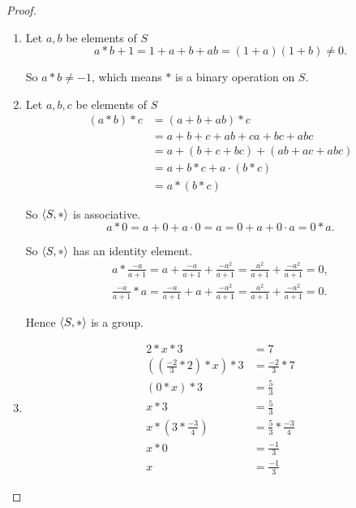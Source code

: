 \begin{proof}
    \begin{enumerate}[label={\textbf{\alph*.}}]
        \item Let $a, b$ be elements of $S$
              \[
                  a * b + 1 = 1 + a + b + ab = (1 + a)(1 + b)\ne 0.
              \]

              So $a * b\ne -1$, which means $*$ is a binary operation on $S$.
        \item Let $a, b, c$ be elements of $S$
              \begin{align*}
                  (a * b) * c & = (a + b + ab) * c                   \\
                              & = a + b + c + ab + ca + bc + abc     \\
                              & = a + (b + c + bc) + (ab + ac + abc) \\
                              & = a + b * c + a\cdot (b * c)         \\
                              & = a * (b * c)
              \end{align*}

              So $\left\langle{S, *}\right\rangle$ is associative.
              \[
                  a * 0 = a + 0 + a\cdot 0 = a = 0 + a + 0\cdot a = 0 * a.
              \]

              So $\left\langle{S, *}\right\rangle$ has an identity element.
              \[
                  \begin{split}
                      a * \frac{-a}{a+1} = a + \frac{-a}{a+1} + \frac{-a^{2}}{a+1} = \frac{a^{2}}{a+1} + \frac{-a^{2}}{a+1} = 0, \\
                      \frac{-a}{a+1} * a = \frac{-a}{a+1} + a + \frac{-a^{2}}{a+1} = \frac{a^{2}}{a+1} + \frac{-a^{2}}{a+1} = 0.
                  \end{split}
              \]

              Hence $\left\langle{S, *}\right\rangle$ is a group.
        \item
              \begin{align*}
                  2 * x * 3                                          & = 7                          \\
                  \left(\left(\frac{-2}{3} * 2\right) * x\right) * 3 & = \frac{-2}{3} * 7           \\
                  (0 * x) * 3                                        & = \frac{5}{3}                \\
                  x * 3                                              & = \frac{5}{3}                \\
                  x * \left(3 * \frac{-3}{4}\right)                  & = \frac{5}{3} * \frac{-3}{4} \\
                  x * 0                                              & = \frac{-1}{3}               \\
                  x                                                  & = \frac{-1}{3}
              \end{align*}


\end{enumerate}
\end{proof}
